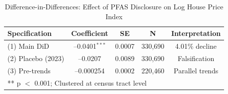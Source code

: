 \begin{table}[h]
\centering
\caption{Difference-in-Differences: Effect of PFAS Disclosure on Log House Price Index}
\label{table:main}
\begin{tabular}{lcccc}
\toprule
Specification & Coefficient & SE & N & Interpretation \\
\midrule
(1) Main DiD & --0.0401$^{***}$ & 0.0007 & 330,690 & 4.01\% decline \\
(2) Placebo (2023) & --0.0207 & 0.0089 & 330,690 & Falsification \\
(3) Pre-trends & --0.000254 & 0.0002 & 220,460 & Parallel trends \\
\bottomrule
\multicolumn{5}{l}{\footnotesize *** p $<$ 0.001; Clustered at census tract level}
\end{tabular}
\end{table}
